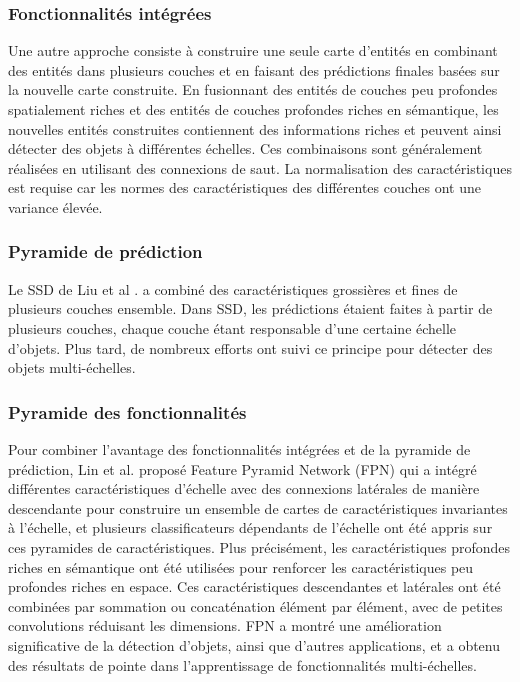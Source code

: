      \subsubsection{Fonctionnalités intégrées} Une autre approche consiste à construire une seule carte d'entités en combinant des entités dans plusieurs couches et en faisant des prédictions finales basées sur la nouvelle carte construite. En fusionnant des entités de couches peu profondes spatialement riches et des entités de couches profondes riches en sémantique, les nouvelles entités construites contiennent des informations riches et peuvent ainsi détecter des objets à différentes échelles. Ces combinaisons sont généralement réalisées en utilisant des connexions de saut. La normalisation des caractéristiques est requise car les normes des caractéristiques des différentes couches ont une variance élevée.
     \subsubsection{Pyramide de prédiction} Le SSD de Liu et al \cite{ssd_paper}. a combiné des caractéristiques grossières et fines de plusieurs couches ensemble. Dans SSD, les prédictions étaient faites à partir de plusieurs couches, chaque couche étant responsable d'une certaine échelle d'objets. Plus tard, de nombreux efforts ont suivi ce principe pour détecter des objets multi-échelles.
     \subsubsection{Pyramide des fonctionnalités} Pour combiner l'avantage des fonctionnalités intégrées et de la pyramide de prédiction, Lin et al. proposé Feature Pyramid Network (FPN) \cite{fpn_paper} qui a intégré différentes caractéristiques d'échelle avec des connexions latérales de manière descendante pour construire un ensemble de cartes de caractéristiques invariantes à l'échelle, et plusieurs classificateurs dépendants de l'échelle ont été appris sur ces pyramides de caractéristiques. Plus précisément, les caractéristiques profondes riches en sémantique ont été utilisées pour renforcer les caractéristiques peu profondes riches en espace. Ces caractéristiques descendantes et latérales ont été combinées par sommation ou concaténation élément par élément, avec de petites convolutions réduisant les dimensions. FPN a montré une amélioration significative de la détection d'objets, ainsi que d'autres applications, et a obtenu des résultats de pointe dans l'apprentissage de fonctionnalités multi-échelles.

